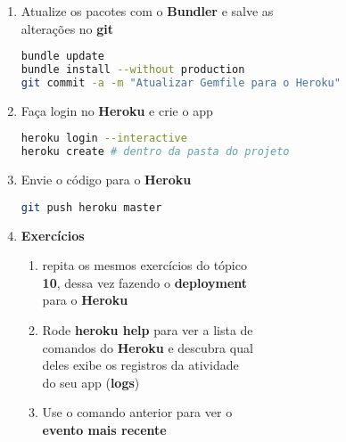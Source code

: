 \documentclass[a4paper,12pt]{article}
\begin{document}
\begin{enumerate}
  \item Atualize os pacotes com o \textbf{Bundler} e salve as \\
        alterações no \textbf{git}

    \begin{lstlisting}[language=Bash, commentstyle=\color{gray}]
bundle update
bundle install --without production
git commit -a -m "Atualizar Gemfile para o Heroku"
    \end{lstlisting}

  \item Faça login no \textbf{Heroku} e crie o app

    \begin{lstlisting}[language=Bash, commentstyle=\color{gray}]
heroku login --interactive
heroku create # dentro da pasta do projeto
    \end{lstlisting}

  \item Envie o código para o \textbf{Heroku}

    \begin{lstlisting}[language=Bash, commentstyle=\color{gray}]
git push heroku master
    \end{lstlisting}

  \item \textbf{Exercícios}

    \begin{enumerate}
      \item repita os mesmos exercícios do tópico \\
            \textbf{10}, dessa vez fazendo o \textbf{deployment} \\
            para o \textbf{Heroku}
      \item Rode \textbf{heroku help} para ver a lista de \\
            comandos do \textbf{Heroku} e descubra qual \\
            deles exibe os registros da atividade \\
            do seu app (\textbf{logs})
      \item Use o comando anterior para ver o \\
            \textbf{evento mais recente}
    \end{enumerate}
\end{enumerate}
\end{document}
